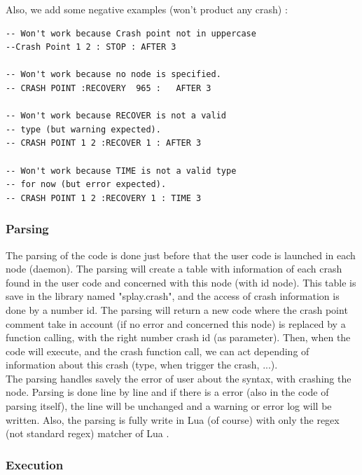 \documentclass{eplmastersthesis}
\begin{document}
        Also, we add some negative examples (won't product any crash) :
       
        \begin{lstlisting}[style=lua]
-- Won't work because Crash point not in uppercase
--Crash Point 1 2 : STOP : AFTER 3   

-- Won't work because no node is specified.
-- CRASH POINT :RECOVERY  965 :   AFTER 3 

-- Won't work because RECOVER is not a valid
-- type (but warning expected).
-- CRASH POINT 1 2 :RECOVER 1 : AFTER 3  

-- Won't work because TIME is not a valid type 
-- for now (but error expected).
-- CRASH POINT 1 2 :RECOVERY 1 : TIME 3
        \end{lstlisting}

        \subsubsection{Parsing}
        
        The parsing of the code is done just before that the user code is launched in each node (daemon). The parsing will 
        create a table with information of each crash found in the user code and concerned with this node (with id node). 
        This table is save in the library named "splay.crash", and the access of crash information is done by a number id.
        The parsing will return a new code where the crash point comment take in account (if no error and concerned this node)
        is replaced by a function calling, with the right number crash id (as parameter). Then, when the code will execute, 
        and the crash function call, we can act depending of information about this crash (type, when trigger the crash, ...).\\

        The parsing handles savely the error of user about the syntax, with crashing the node. Parsing is done
        line by line and if there is a error (also in the code of parsing itself), the line will be unchanged and 
        a warning or error log will be written. Also, the parsing is fully write in Lua (of course) with only 
        the regex (not standard regex) matcher of Lua \cite{RegexLua}.

        \subsubsection{Execution}
\end{document}
